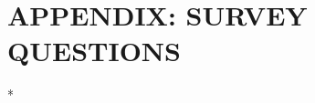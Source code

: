\chapter{APPENDIX: SURVEY QUESTIONS}\label{appendix:survey_questions}

\makeatletter
\newcommand{\radiobutton}{
	\begin{tikzpicture}
		\pgfmathsetlengthmacro\radius{height("X")/2}
		\draw[radius=\radius] circle;
	\end{tikzpicture}
}
\makeatother

\newenvironment{surveydescription}
{
	\small\color{darkgray}
}

\newcommand{\surveyasterix}{
	\color{red}*\color{black}
}

\newcommand{\greencheckmark}{
	\color{green}\ding{51}\color{black}
}

\newcommand{\redcross}{
	\color{red}\ding{53}\color{black}
}

\newcommand{\othertextfield}{
	\begin{tikzpicture}
		\node[draw,align=left,fill={rgb:black,1;white,15}] {\color{gray}Other \hspace*{10em}};
	\end{tikzpicture}
}

\newcommand{\longtextfield}{
	\begin{tikzpicture}
		\node[draw,align=left,fill={rgb:black,1;white,15}] {\color{gray}Enter your answer \hspace*{20em}\\};
	\end{tikzpicture}
}

\newcommand{\likertscaledescription}{
	1\hspace*{2em}2\hspace*{2em}3\hspace*{2em}4\hspace*{2em}5\hspace*{2em}6
}

\newcommand{\likertscalebuttons}{
	\hspace*{0.2em}\radiobutton\hspace*{1.318em}\radiobutton\hspace*{1.318em}\radiobutton\hspace*{1.318em}\radiobutton\hspace*{1.318em}\radiobutton\hspace*{1.318em}\radiobutton\hspace*{0.2em}
}

